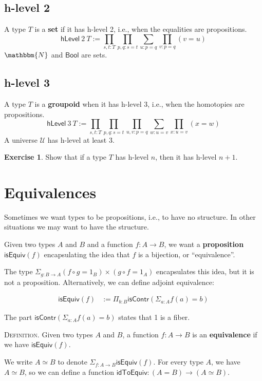 \documentclass{amsart}
\theoremstyle{definition}
\newtheorem{ex}{Exercise}[section]
\newcommand{\N}{\mathbbm{N}}
\newcommand{\Bool}{\ensuremath{\mathsf{Bool}}}
\newcommand{\isContr}{\ensuremath{\mathsf{isContr}}}
\newcommand{\hLevel}[2]{\ensuremath{\mathsf{hLevel}~#1~#2}}
\newcommand{\isEquiv}{\ensuremath{\mathsf{isEquiv}}}
\newcommand{\idToEquiv}{\ensuremath{\mathsf{idToEquiv}}}
\newcommand{\U}{\ensuremath{\mathcal{U}}}
\renewcommand{\emph}{\textbf}
\begin{document}
\subsection{h-level 2}\label{sec:h-level-2}
A type $T$ is a \emph{set} if it has h-level 2, i.e., when the equalities are propositions.
\[
    \hLevel{2}{T} := \prod_{s,t : T}\prod_{p,q : s = t}\sum_{u : p = q}\prod_{v : p = q}(v = u)
\]
$\N$ and $\Bool$ are sets.
\subsection{h-level 3}\label{sec:h-level-3}
A type $T$ is a \emph{groupoid} when it has h-level 3, i.e., when the homotopies are propositions.
\[
    \hLevel{3}{T} := \prod_{s,t : T}\prod_{p,q : s = t}\prod_{u,v : p = q}\sum_{w : u = v}\prod_{x : u = v}(x = w)
\]
A universe $\U$ has h-level at least 3.

\begin{ex}
Show that if a type $T$ has h-level $n$, then it has h-level $n + 1$.
\end{ex}

\section{Equivalences}
Sometimes we want types to be propositions, i.e., to have no structure. In other situations we may want to have the structure.

Given two types $A$ and $B$ and a function $f : A \rightarrow B$, we want a \textbf{proposition} $\isEquiv(f)$ encapsulating the idea that $f$ is a bijection, or ``equivalence''.

The type $\Sigma_{g : B \rightarrow A} (f \circ g = 1_B) \times (g \circ f = 1_A)$ encapsulates this idea, but it is not a  proposition. Alternatively, we can define adjoint equivalence:

\begin{align*}
\isEquiv(f) &:= \Pi_{b : B} \isContr(\Sigma_{a : A} f(a)=b)
\end{align*}



The part $\isContr(\Sigma_{a : A} f(a)=b)$ states that 1 is a fiber. %

\textsc{Definition.} Given two types $A$ and $B$, a function $f : A \rightarrow B$ is an \textbf{equivalence} if we have $\isEquiv(f)$.

We write $A \simeq B$ to denote $\Sigma_{f : A \rightarrow B} \isEquiv(f)$. For every type $A$, we have $A \simeq B$, so we can define a function $\idToEquiv: (A=B) \rightarrow (A \simeq B)$.
\end{document}

